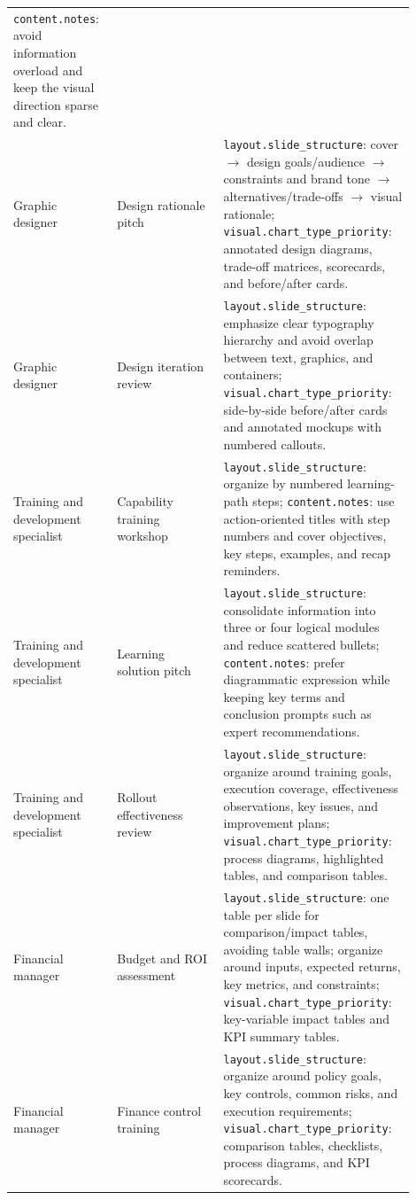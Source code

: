 \documentclass{llmxive}
\begin{document}
\begin{longtable}{>{\scriptsize\arraybackslash}p{0.22\linewidth}
                  >{\scriptsize\arraybackslash}p{0.25\linewidth}
                  >{\scriptsize\arraybackslash}p{0.43\linewidth}}
\texttt{content.notes}: avoid information overload and keep the visual
direction sparse and clear. \\
Graphic designer & Design rationale pitch &
\texttt{layout.slide\_structure}: cover $\rightarrow$ design goals/audience
$\rightarrow$ constraints and brand tone $\rightarrow$ alternatives/trade-offs
$\rightarrow$ visual rationale;
\texttt{visual.chart\_type\_priority}: annotated design diagrams, trade-off
matrices, scorecards, and before/after cards. \\
Graphic designer & Design iteration review &
\texttt{layout.slide\_structure}: emphasize clear typography hierarchy and
avoid overlap between text, graphics, and containers;
\texttt{visual.chart\_type\_priority}: side-by-side before/after cards and
annotated mockups with numbered callouts. \\
\midrule
Training and development specialist & Capability training workshop &
\texttt{layout.slide\_structure}: organize by numbered learning-path steps;
\texttt{content.notes}: use action-oriented titles with step numbers and cover
objectives, key steps, examples, and recap reminders. \\
Training and development specialist & Learning solution pitch &
\texttt{layout.slide\_structure}: consolidate information into three or four
logical modules and reduce scattered bullets;
\texttt{content.notes}: prefer diagrammatic expression while keeping key terms
and conclusion prompts such as expert recommendations. \\
Training and development specialist & Rollout effectiveness review &
\texttt{layout.slide\_structure}: organize around training goals, execution
coverage, effectiveness observations, key issues, and improvement plans;
\texttt{visual.chart\_type\_priority}: process diagrams, highlighted tables,
and comparison tables. \\
\midrule
Financial manager & Budget and ROI assessment &
\texttt{layout.slide\_structure}: one table per slide for comparison/impact
tables, avoiding table walls; organize around inputs, expected returns, key
metrics, and constraints;
\texttt{visual.chart\_type\_priority}: key-variable impact tables and KPI
summary tables. \\
Financial manager & Finance control training &
\texttt{layout.slide\_structure}: organize around policy goals, key controls,
common risks, and execution requirements;
\texttt{visual.chart\_type\_priority}: comparison tables, checklists, process
diagrams, and KPI scorecards. \\

\end{longtable}
\end{document}
